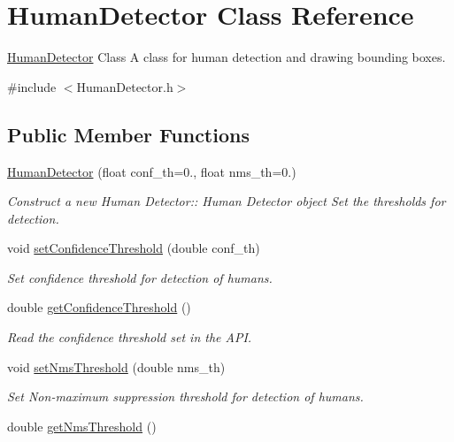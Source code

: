 \hypertarget{classHumanDetector}{}\section{Human\+Detector Class Reference}
\label{classHumanDetector}


\hyperlink{classHumanDetector}{Human\+Detector} Class A class for human detection and drawing bounding boxes.  




{\ttfamily \#include $<$Human\+Detector.\+h$>$}

\subsection*{Public Member Functions}
\begin{DoxyCompactItemize}
\item 
\hyperlink{classHumanDetector_a6a814e1705029576a7cb57a5727482e7}{Human\+Detector} (float conf\+\_\+th=0., float nms\+\_\+th=0.)
\begin{DoxyCompactList}\small\item\em Construct a new Human Detector\+:\+: Human Detector object Set the thresholds for detection. \end{DoxyCompactList}\item 
void \hyperlink{classHumanDetector_aef7db39618f879d6e531e1f681553584}{set\+Confidence\+Threshold} (double conf\+\_\+th)
\begin{DoxyCompactList}\small\item\em Set confidence threshold for detection of humans. \end{DoxyCompactList}\item 
double \hyperlink{classHumanDetector_ae4d532d10e125e6f09f75896ddf37616}{get\+Confidence\+Threshold} ()
\begin{DoxyCompactList}\small\item\em Read the confidence threshold set in the A\+PI. \end{DoxyCompactList}\item 
void \hyperlink{classHumanDetector_a2120c8b55ea174c3742573ef9ed4549f}{set\+Nms\+Threshold} (double nms\+\_\+th)
\begin{DoxyCompactList}\small\item\em Set Non-\/maximum suppression threshold for detection of humans. \end{DoxyCompactList}\item 
double \hyperlink{classHumanDetector_a74f85f00e46601ceb2d6942e7ecf41eb}{get\+Nms\+Threshold} ()

\end{DoxyCompactItemize}
